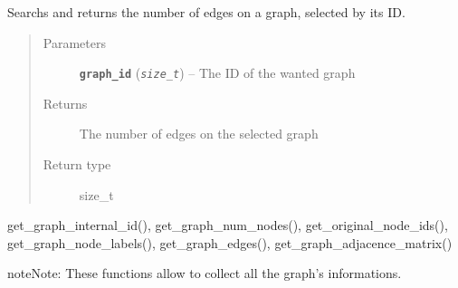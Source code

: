 \documentclass[letterpaper,10pt,english]{sphinxmanual}
\begin{document}

\begin{fulllineitems}
\label{doc:gedlibpy.get_graph_num_edges}
Searchs and returns the number of edges on a graph, selected by its ID.
\begin{quote}\begin{description}
\item[{Parameters}] \leavevmode
\textbf{\texttt{graph\_id}} (\emph{\texttt{size\_t}}) -- The ID of the wanted graph

\item[{Returns}] \leavevmode
The number of edges on the selected graph

\item[{Return type}] \leavevmode
size\_t

\end{description}\end{quote}




get\_graph\_internal\_id(), get\_graph\_num\_nodes(), get\_original\_node\_ids(), get\_graph\_node\_labels(), get\_graph\_edges(), get\_graph\_adjacence\_matrix()



\begin{notice}{note}{Note:}
These functions allow to collect all the graph's informations.
\end{notice}

\end{fulllineitems}

\end{document}
